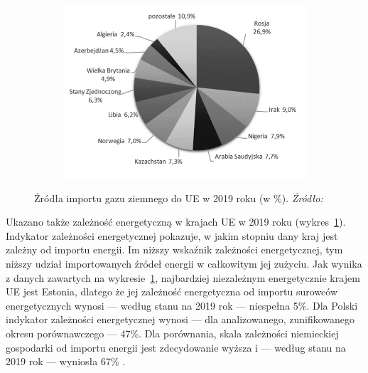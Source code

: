 \documentclass[polish, twoside, 12pt, a4paper]{article}
\theoremstyle{definition}
\theoremstyle{plain}
\theoremstyle{remark}
\begin{document}
\begin{figure}[hbt]
  \centering

  \begin{subfigure}[t]{0.45\textwidth}
    \hspace{-1cm}
    \includegraphics[width=1.3\textwidth]{./out_figures/figure_3}
  \end{subfigure}

  \captionsetup{margin=10pt,font=small,labelfont=bf,width=.8\textwidth}

  \caption[Źródła importu gazu ziemnego do UE w 2019 roku (w \%).]{Źródła importu gazu ziemnego do UE w 2019 roku (w \%). \textit{Źródło:} \cite{pangsykania2022}}\label{fig:x3}
\end{figure}

Ukazano także zależność energetyczną w krajach UE w 2019 roku (wykres~\ref{fig:x3}). Indykator zależności energetycznej pokazuje, w jakim stopniu dany kraj jest zależny od importu energii. Im niższy wskaźnik zależności energetycznej, tym niższy udział importowanych źródeł energii w całkowitym jej zużyciu. Jak wynika z danych zawartych na wykresie~\ref{fig:x3}, najbardziej niezależnym energetycznie krajem UE jest Estonia, dlatego że jej zależność energetyczna od importu surowców energetycznych wynosi --- według stanu na 2019 rok --- niespełna 5\%. Dla Polski indykator zależności energetycznej wynosi --- dla analizowanego, zunifikowanego okresu porównawczego --- 47\%. Dla porównania, skala zależności niemieckiej gospodarki od importu energii jest zdecydowanie wyższa i --- według stanu na 2019 rok --- wyniosła 67\% \citep{pangsykania2022}.
\end{document}
